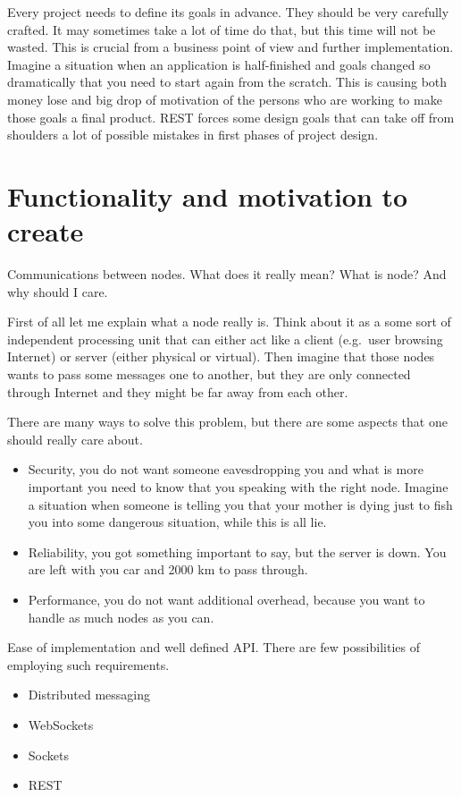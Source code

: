 Every project needs to define its goals in advance. They should be very carefully crafted. It may sometimes take a lot of time do that, but this time will not be wasted. This is crucial from a business point of view and further implementation. Imagine a situation when an application is half-finished and goals changed so dramatically that you need to start again from the scratch. This is causing both money lose and big drop of motivation of the persons who are working to make those goals a final product. REST forces some design goals that can take off from shoulders a lot of possible mistakes in first phases of project design.

\section{Functionality and motivation to create}
Communications between nodes. What does it really mean? What is node? And why should I care.

First of all let me explain what a node really is. Think about it as a some sort of independent processing unit that can either act like a client (e.g.\ user browsing Internet) or server (either physical or virtual). Then imagine that those nodes wants to pass some messages one to another, but they are only connected through Internet and they might be far away from each other.

There are many ways to solve this problem, but there are some aspects that one should really care about.


\begin{itemize}
\item Security, you do not want someone eavesdropping you and what is more important you need to know that you speaking with the right node. Imagine a situation when someone is telling you that your mother is dying just to fish you into some dangerous situation, while this is all lie.

\item Reliability, you got something important to say, but the server is down. You are left with you car and 2000 km to pass through.

\item Performance, you do not want additional overhead, because you want to handle as much nodes as you can.
\end{itemize}

Ease of implementation and well defined API\@. There are few possibilities of employing such requirements.
\begin{itemize}
\item Distributed messaging
\item WebSockets
\item Sockets
\item REST
\end{itemize}

